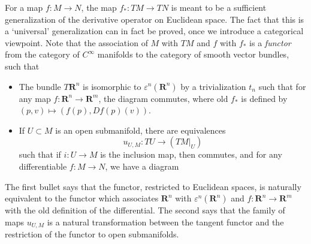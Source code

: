 For a map $f:M \to N$, the map $f_*: TM \to TN$ is meant to be a sufficient generalization of the derivative operator on Euclidean space. The fact that this is a `universal' generalization can in fact be proved, once we introduce a categorical viewpoint. Note that the association of $M$ with $TM$ and $f$ with $f_*$ is a {\it functor} from the category of $C^\infty$ manifolds to the category of smooth vector bundles, such that
%
\begin{itemize}
    \item The bundle $T\mathbf{R}^n$ is isomorphic to $\varepsilon^n(\mathbf{R}^n)$ by a trivialization $t_n$ such that for any map $f: \mathbf{R}^n \to \mathbf{R}^m$, the diagram
    commutes, where $\text{old $f_*$}$ is defined by $(p,v) \mapsto (f(p), Df(p)(v))$.
    \item If $U \subset M$ is an open submanifold, there are equivalences
    \[ u_{U,M}: TU \to (TM|_U) \]
    such that if $i: U \to M$ is the inclusion map, then
    commutes, and for any differentiable $f:M \to N$, we have a diagram
\end{itemize}
%
The first bullet says that the functor, restricted to Euclidean spaces, is naturally equivalent to the functor which associates $\mathbf{R}^n$ with $\varepsilon^n(\mathbf{R}^n)$ and $f: \mathbf{R}^n \to \mathbf{R}^m$ with the old definition of the differential. The second says that the family of maps $u_{U,M}$ is a natural transformation between the tangent functor and the restriction of the functor to open submanifolds.

